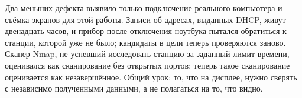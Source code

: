Два меньших дефекта выявило только подключение реального компьютера и съёмка экранов для этой работы. Записи об адресах, выданных DHCP, живут двенадцать часов, и прибор после отключения ноутбука пытался обратиться к станции, которой уже не было; кандидаты в цели теперь проверяются заново. Сканер Nmap, не успевший исследовать станцию за заданный лимит времени, оценивался как сканирование без открытых портов; теперь такое сканирование оценивается как незавершённое. Общий урок: то, что на дисплее, нужно сверять с независимо полученными данными, а не полагаться на то, что видно.
